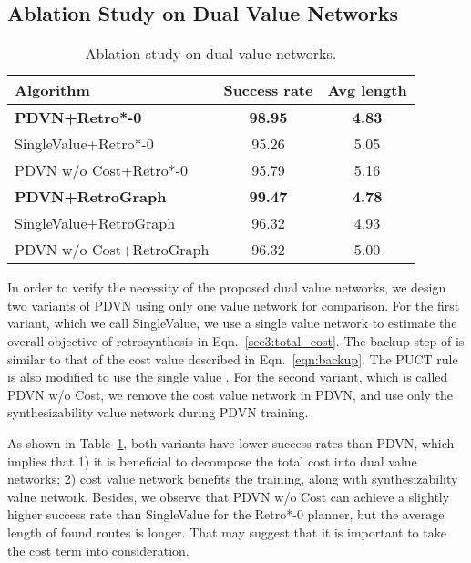 \documentclass[nohyperref]{article}
\theoremstyle{plain}
\theoremstyle{definition}
\theoremstyle{remark}
\begin{document}
\subsection{Ablation Study on Dual Value Networks}

\begin{table}[t]
\caption{Ablation study on dual value networks. 
}
\label{tab:ablation_study}
\centering
\resizebox{\columnwidth}{!} {\begin{tabular}{l c c}
    \toprule
Algorithm & Success rate & Avg length \\
    \midrule
\textbf{PDVN+Retro*-0} & \textbf{98.95} & \textbf{4.83}  \\
    SingleValue+Retro*-0 & 95.26 & 5.05  \\
PDVN w/o Cost+Retro*-0 & 95.79 & 5.16  \\
    \midrule
\textbf{PDVN+RetroGraph} & \textbf{99.47} & \textbf{4.78} \\
    SingleValue+RetroGraph & 96.32 & 4.93  \\
    PDVN w/o Cost+RetroGraph & 96.32 & 5.00  \\
    \bottomrule
\end{tabular}}
\end{table}


In order to verify the necessity of the proposed dual value networks, we design two variants of PDVN using only one value network for comparison. 
For the first variant, which we call SingleValue, we use a single value network  to estimate the overall objective of retrosynthesis in Eqn.~\ref{sec3:total_cost}.
The backup step of  is similar to that of  the cost value  described in Eqn.~\ref{eqn:backup}.
The PUCT rule is also modified to use the single value .
For the second variant, which is called PDVN w/o Cost, we remove the cost value network in PDVN, and use only the synthesizability value network during PDVN training. 



As shown in Table~\ref{tab:ablation_study}, both variants have lower success rates than PDVN, which implies that 1) it is beneficial to decompose the total cost into dual value networks;
2) cost value network benefits the training, along with synthesizability value network.
Besides, we observe that PDVN w/o Cost can achieve a slightly higher success rate than SingleValue for the Retro*-0 planner, but the average length of found routes is longer.  
That may suggest that it is important to take 
the cost term into consideration.
\end{document}
